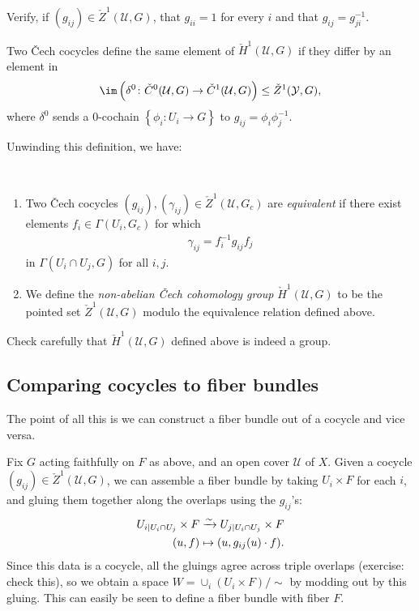 \documentclass[11pt]{book}
\begin{document}
\begin{exercise} Verify, if $(g_{ij}) \in \check{Z}^1(\mathcal{U},G)$, that $g_{ii} = 1$ for every $i$ and that $g_{ij} = g_{ji}^{-1}$.
\end{exercise}

Two \v{C}ech cocycles define the same element of $\check{H}^1(\mathcal{U},G)$ if they differ by an element in 
\[
\im \left( \delta^0 \colon \check{C}^0(\mathcal{U},G) \to \check{C}^1(\mathcal{U},G) \right) \le \check{Z}^1(\mathcal{Y},G),\]
where $\delta^0$ sends a $0$-cochain $\left\{ \phi_i \colon U_i \to G \right\}$ to $g_{ij} = \phi_i \phi_j^{-1}$.

Unwinding this definition, we have:

\begin{definition}\label{def:non-abelian-cech-h1} \,
\begin{enumerate}
    \item Two \v{C}ech cocycles $(g_{ij}), (\gamma_{ij}) \in \check{Z}^1(\mathcal{U},G_c)$ are \emph{equivalent} if there exist elements $f_i \in \Gamma(U_i,G_c)$ for which
    \begin{align*}
        \gamma_{ij} = f_i^{-1} g_{ij} f_j
    \end{align*}
    in $\Gamma(U_i\cap U_j,G)$ for all $i,j$.
    \item We define the \emph{non-abelian \v{C}ech cohomology group} $\check{H}^1(\mathcal{U},G)$ to be the pointed set $\check{Z}^1(\mathcal{U},G)$ modulo the equivalence relation defined above.
\end{enumerate}
\end{definition}

\begin{exercise} Check carefully that $\check{H}^1(\mathcal{U},G)$ defined above is indeed a group.
\end{exercise}

\subsection{Comparing cocycles to fiber bundles}

The point of all this is we can construct a fiber bundle out of a cocycle and vice versa.

\begin{construction}
\label{constr:fiber-bundle-from-cocycle}
Fix $G$ acting faithfully on $F$ as above, and an open cover $\mathcal{U}$ of $X$. Given a cocycle $(g_{ij})\in \check{Z}^1(\mathcal{U},G)$, we can assemble a fiber bundle by taking $U_i \times F$ for each $i$, and gluing them together along the overlaps using the $g_{ij}$'s:
\begin{align*}
    U_{i|U_i\cap U_j} \times F &\xrightarrow{\sim} U_{j|U_i\cap U_j} \times F \\
    (u,f) &\mapsto (u, g_{ij}(u)\cdot f).
\end{align*}
%
Since this data is a cocycle, all the gluings agree across triple overlaps (exercise: check this), so we obtain a space $W = \cup_i (U_i \times F) /\sim$ by modding out by this gluing. This can easily be seen to define a fiber bundle with fiber $F$.
\end{construction}
\end{document}
